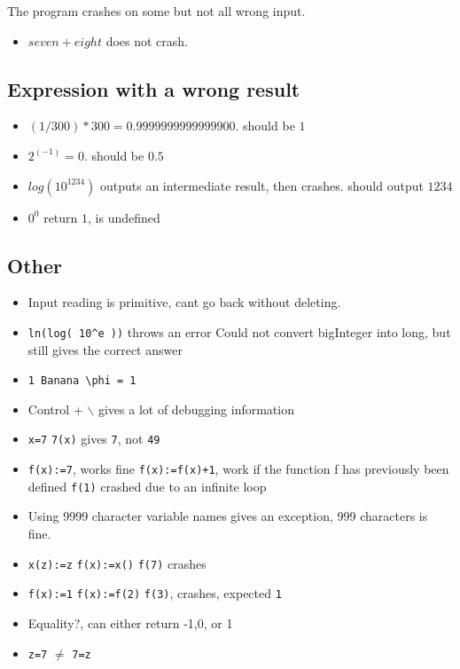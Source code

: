 \documentclass[11pt,a4paper]{article}
\begin{document}
The program crashes on some but not all wrong input.
\begin{itemize}
\item \(seven + eight\) does not crash.
\end{itemize}
\subsection{Expression with a wrong result}
\label{sec:orgheadline35}
\begin{itemize}
\item \((1 / 300) * 300 = 0.9999999999999900\). should be \(1\)
\item \(2^(-1) = 0\). should be \(0.5\)
\item \(log( 10 ^ 1234)\) outputs an intermediate result, then crashes. should output \(1234\)
\item \(0^0\) return \(1\), is undefined
\end{itemize}

\subsection{Other}
\label{sec:orgheadline36}
\begin{itemize}
\item Input reading is primitive, cant go back without deleting.
\item \texttt{ln(log( 10\textasciicircum{}e ))} throws an error Could not convert bigInteger into long, but still gives the correct answer
\item \texttt{1 Banana \textbackslash{}phi = 1}
\item Control + $\backslash$ gives a lot of debugging information
\item \texttt{x=7}
      \texttt{7(x)} gives \texttt{7}, not \texttt{49}
\item \texttt{f(x):=7}, works fine
\texttt{f(x):=f(x)+1}, work if the function f has previously been defined
\texttt{f(1)} crashed due to an infinite loop
\item Using 9999 character variable names gives an exception, 999 characters is fine.
\item \texttt{x(z):=z}
      \texttt{f(x):=x()}
      \texttt{f(7)}
      crashes
\item \texttt{f(x):=1}
      \texttt{f(x):=f(2)}
      \texttt{f(3)}, crashes, expected \texttt{1}
\item Equality?, can either return -1,0, or 1
\item \texttt{z=7} \(\ne\) \texttt{7=z}
\end{itemize}
\end{document}
